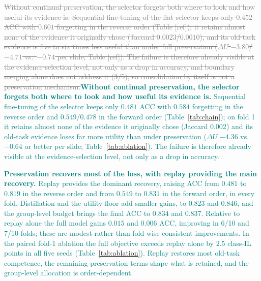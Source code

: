 \documentclass{article}
\newif\ifmarkup \markuptrue
\newcommand{\repc}[3]{\ifmarkup\textcolor{gray}{\sout{#2}}\textcolor{#1}{#3}\else#3\fi}
\newcommand{\repG}[2]{\repc{teal}{#1}{#2}}    %
\begin{document}
\repG{Without continual preservation, the selector forgets both where to look and how useful its evidence is. Sequential fine-tuning of the flat selector keeps only $0.452$ ACC with $0.601$ forgetting in the reverse order (Table [ref]); it retains almost none of the evidence it originally chose (Jaccard $0.0023$/$0.0010$), and its old-task evidence is five to six times less useful than under full preservation ($\Delta U$ $-3.80$/$-4.71$ vs.\ $-0.74$ per slide; Table [ref]). The failure is therefore already visible at the evidence-selection level, not only as a drop in accuracy, and boundary merging alone does not address it (3/5), so consolidation by itself is not a preservation mechanism.}{\textbf{Without continual preservation, the selector forgets both where to look and how useful its evidence is.} Sequential fine-tuning of the selector keeps only $0.481$ ACC with $0.584$ forgetting in the reverse order and $0.549$/$0.478$ in the forward order (Table~\ref{tab:chain}); on fold 1 it retains almost none of the evidence it originally chose (Jaccard $0.002$) and its old-task evidence loses far more utility than under preservation ($\Delta U$ $-4.36$ vs.\ $-0.64$ or better per slide; Table~\ref{tab:ablation}). The failure is therefore already visible at the evidence-selection level, not only as a drop in accuracy.}

\repG{}{\textbf{Preservation recovers most of the loss, with replay providing the main recovery.} Replay provides the dominant recovery, raising ACC from $0.481$ to $0.819$ in the reverse order and from $0.549$ to $0.831$ in the forward order, in every fold. Distillation and the utility floor add smaller gains, to $0.823$ and $0.846$, and the group-level budget brings the final ACC to $0.834$ and $0.837$. Relative to replay alone the full model gains $0.015$ and $0.006$ ACC, improving in 6/10 and 7/10 folds; these are modest rather than fold-wise consistent improvements. In the paired fold-1 ablation the full objective exceeds replay alone by $2.5$ class-IL points in all five seeds (Table~\ref{tab:ablation}). Replay restores most old-task competence, the remaining preservation terms shape what is retained, and the group-level allocation is order-dependent.}
\end{document}
